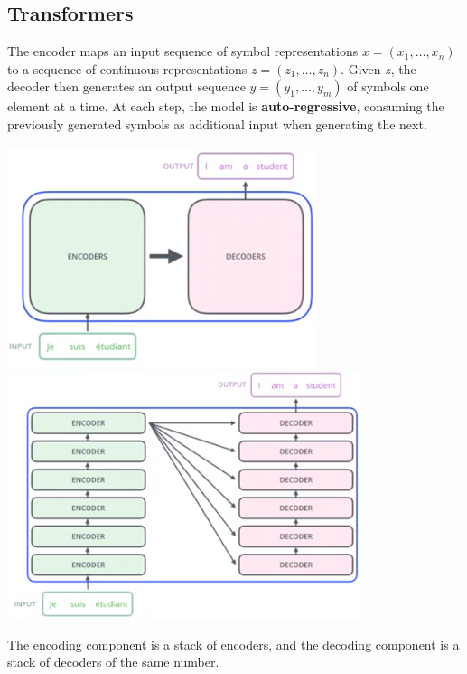 \documentclass[10pt]{report}
\begin{document}
\subsection{Transformers}
The encoder maps an input sequence of symbol representations $x = (x_1,\ldots,x_n)$ to a sequence of continuous representations $z = (z_1,\ldots,z_n)$. Given $z$, the decoder then generates an output sequence $y = (y_1,\ldots,y_m)$ of symbols one element at a time. At each step, the model is \textbf{auto-regressive}, consuming the previously generated symbols as additional input when generating the next.
\begin{center}
	\includegraphics[scale=0.5]{70.png} \includegraphics[scale=0.5]{71.png}
\end{center}
The encoding component is a stack of encoders, and the decoding component is a stack of decoders of the same number.
\end{document}
